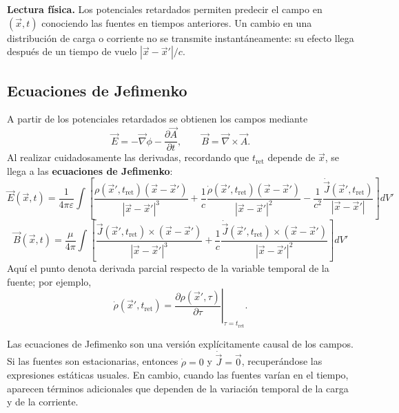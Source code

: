 \documentclass[12pt,a4paper]{article}
\theoremstyle{definition}
\theoremstyle{plain}
\numberwithin{equation}{section}
\theoremstyle{remark}
\newcommand{\E}{\vec{E}}
\newcommand{\B}{\vec{B}}
\begin{document}
\begin{cajaidea}
\textbf{Lectura física.} Los potenciales retardados permiten predecir el campo en $(\vec x,t)$ conociendo las fuentes en tiempos anteriores. Un cambio en una distribución de carga o corriente no se transmite instantáneamente: su efecto llega después de un tiempo de vuelo $|\vec x-\vec x'|/c$.
\end{cajaidea}

\subsection{Ecuaciones de Jefimenko}
\label{subsec:ecuaciones-jefimenko}

A partir de los potenciales retardados se obtienen los campos mediante
\begin{equation*}
    \E=-\vec\nabla\phi-\frac{\partial\vec A}{\partial t},
    \qquad
    \B=\vec\nabla\times\vec A.
\end{equation*}
Al realizar cuidadosamente las derivadas, recordando que $t_{\mathrm{ret}}$ depende de $\vec x$, se llega a las \textbf{ecuaciones de Jefimenko}:
\begin{equation}
    \boxed{
    \E(\vec x,t)=\frac{1}{4\pi\varepsilon}\int
    \left[
    \frac{\rho(\vec x',t_{\mathrm{ret}})(\vec x-\vec x')}{|\vec x-\vec x'|^3}
    +\frac{1}{c}\frac{\dot\rho(\vec x',t_{\mathrm{ret}})(\vec x-\vec x')}{|\vec x-\vec x'|^2}
    -\frac{1}{c^2}\frac{\dot{\vec J}(\vec x',t_{\mathrm{ret}})}{|\vec x-\vec x'|}
    \right]dV'
    }
    \label{eq:rad-jefimenko-E}
\end{equation}
\begin{equation}
    \boxed{
    \B(\vec x,t)=\frac{\mu}{4\pi}\int
    \left[
    \frac{\vec J(\vec x',t_{\mathrm{ret}})\times(\vec x-\vec x')}{|\vec x-\vec x'|^3}
    +\frac{1}{c}\frac{\dot{\vec J}(\vec x',t_{\mathrm{ret}})\times(\vec x-\vec x')}{|\vec x-\vec x'|^2}
    \right]dV'
    }
    \label{eq:rad-jefimenko-B}
\end{equation}
Aquí el punto denota derivada parcial respecto de la variable temporal de la fuente; por ejemplo,
\begin{equation*}
    \dot\rho(\vec x',t_{\mathrm{ret}})=
    \left.\frac{\partial\rho(\vec x',\tau)}{\partial\tau}\right|_{\tau=t_{\mathrm{ret}}}.
\end{equation*}

Las ecuaciones de Jefimenko son una versión explícitamente causal de los campos. Si las fuentes son estacionarias, entonces $\dot\rho=0$ y $\dot{\vec J}=\vec 0$, recuperándose las expresiones estáticas usuales. En cambio, cuando las fuentes varían en el tiempo, aparecen términos adicionales que dependen de la variación temporal de la carga y de la corriente.
\end{document}
